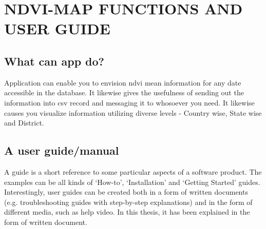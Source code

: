 \chapter{NDVI-MAP FUNCTIONS AND USER GUIDE}
\label{chap:ndvi & it's user guide}

\section{What can app do?}

Application can enable you to envision \gls{ndvi} mean information for any date accessible in the database. It likewise gives the usefulness of sending out the information into \gls{csv} record and messaging it to whosoever you need. It likewise causes you visualize information utilizing diverse levels - Country wise, State wise and District.

\section{A user guide/manual}

A guide is a short reference to some particular aspects of a software product. The examples can be all kinds of ‘How-to’, ‘Installation’ and ‘Getting Started’ guides. Interestingly, user guides can be created both in a form of written documents (e.g. troubleshooting guides with step-by-step explanations) and in the form of different media, such as help video. In this thesis, it has been explained in the form of written document.


